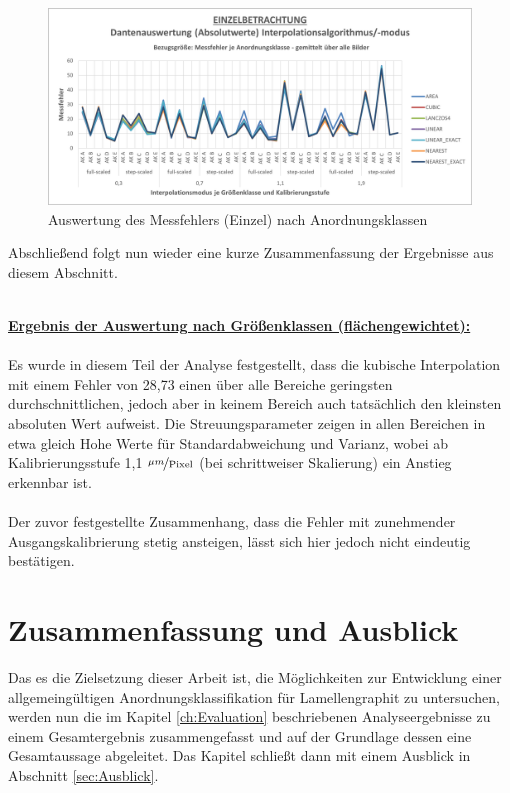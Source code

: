 \documentclass[
fontsize=10pt, 
listof = totoc,
parskip = half	
]{report}
\begin{document}
\begin{figure}[H]
	\centering
	\includegraphics[width=\textwidth, height=\textheight, keepaspectratio]{pics/DA_Einzel_Absolut_AKL}
	\caption{Auswertung des Messfehlers (Einzel) nach Anordnungsklassen}
	\label{fig:DAEinzelAbsolutAKL}
\end{figure}

\noindent Abschließend folgt nun wieder eine kurze Zusammenfassung der Ergebnisse aus diesem Abschnitt.
\\\\
\colorbox{gray!10}{
	\label{box:Ergebnis der Auswertung nach Größenklassen (flächengewichtet):}
	\begin{minipage}{0.975\textwidth}
		\textbf{\underline{Ergebnis der Auswertung nach Größenklassen (flächengewichtet):}}
		\\\\
		Es wurde in diesem Teil der Analyse festgestellt, dass die kubische Interpolation mit einem  Fehler von 28,73 einen über alle Bereiche geringsten durchschnittlichen, jedoch aber in keinem Bereich auch tatsächlich den kleinsten absoluten Wert aufweist. Die Streuungsparameter zeigen in allen Bereichen  in etwa gleich Hohe Werte für Standardabweichung und Varianz, wobei ab Kalibrierungsstufe 1,1 $\nicefrac{\mu m}{\text{Pixel}}$ (bei schrittweiser Skalierung) ein Anstieg erkennbar ist.
		\\\\
		Der zuvor festgestellte Zusammenhang, dass die Fehler mit zunehmender Ausgangskalibrierung stetig ansteigen, lässt sich hier jedoch nicht eindeutig bestätigen.
	\end{minipage}
}

\chapter{Zusammenfassung und Ausblick}

Das es die Zielsetzung dieser Arbeit ist, die Möglichkeiten zur Entwicklung einer allgemeingültigen Anordnungsklassifikation für Lamellengraphit zu untersuchen, werden nun die im Kapitel \ref{ch:Evaluation} beschriebenen Analyseergebnisse zu einem Gesamtergebnis zusammengefasst und auf der Grundlage dessen eine Gesamtaussage abgeleitet. Das Kapitel schließt dann mit einem Ausblick in Abschnitt \ref{sec:Ausblick}.
\end{document}
